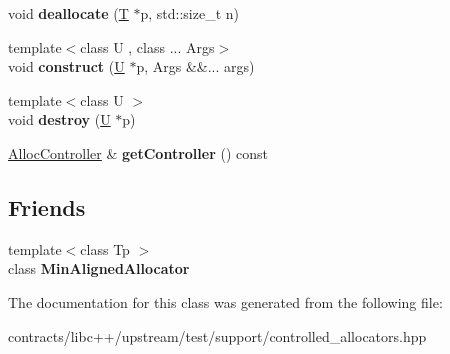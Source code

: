 \begin{DoxyCompactItemize}
\mbox{\label{class_min_aligned_allocator_a7528b3ee67fa52817a618a0b5c8baffa}} 
void {\bfseries deallocate} (\mbox{\hyperlink{struct_t}{T}} $\ast$p, std\+::size\+\_\+t n)
\item 
\mbox{\label{class_min_aligned_allocator_a6f57ce3177357c11a77553d18639e184}} 
{\footnotesize template$<$class U , class ... Args$>$ }\\void {\bfseries construct} (\mbox{\hyperlink{union_u}{U}} $\ast$p, Args \&\&... args)
\item 
\mbox{\label{class_min_aligned_allocator_a7c0dbc1442e16e703dffb44e0eea9d53}} 
{\footnotesize template$<$class U $>$ }\\void {\bfseries destroy} (\mbox{\hyperlink{union_u}{U}} $\ast$p)
\item 
\mbox{\label{class_min_aligned_allocator_a74cfbe56937005484c6c5a87b2e388ae}} 
\mbox{\hyperlink{struct_alloc_controller}{Alloc\+Controller}} \& {\bfseries get\+Controller} () const
\end{DoxyCompactItemize}
\subsection*{Friends}
\begin{DoxyCompactItemize}
\item 
\mbox{\label{class_min_aligned_allocator_acdda281e2492fa69dc1d87b509b00035}} 
{\footnotesize template$<$class Tp $>$ }\\class {\bfseries Min\+Aligned\+Allocator}
\end{DoxyCompactItemize}


The documentation for this class was generated from the following file\+:\begin{DoxyCompactItemize}
\item 
contracts/libc++/upstream/test/support/controlled\+\_\+allocators.\+hpp\end{DoxyCompactItemize}
